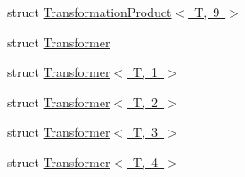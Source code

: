 \begin{DoxyCompactItemize}
struct \mbox{\hyperlink{structmpc_1_1transformation_1_1_transformation_product_3_01_t_00_019_01_4}{Transformation\+Product$<$ T, 9 $>$}}
\item 
struct \mbox{\hyperlink{structmpc_1_1transformation_1_1_transformer}{Transformer}}
\item 
struct \mbox{\hyperlink{structmpc_1_1transformation_1_1_transformer_3_01_t_00_011_01_4}{Transformer$<$ T, 1 $>$}}
\item 
struct \mbox{\hyperlink{structmpc_1_1transformation_1_1_transformer_3_01_t_00_012_01_4}{Transformer$<$ T, 2 $>$}}
\item 
struct \mbox{\hyperlink{structmpc_1_1transformation_1_1_transformer_3_01_t_00_013_01_4}{Transformer$<$ T, 3 $>$}}
\item 
struct \mbox{\hyperlink{structmpc_1_1transformation_1_1_transformer_3_01_t_00_014_01_4}{Transformer$<$ T, 4 $>$}}
\end{DoxyCompactItemize}
